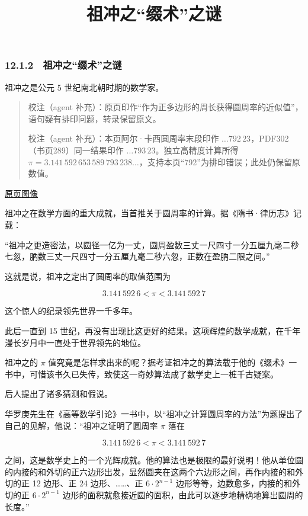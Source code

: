 \documentclass[
  10pt,
  fontset=fandol]{ctexart}
\title{祖冲之``缀术''之谜}
\author{}
\date{}
\begin{document}
\maketitle

\subsubsection{12.1.2　祖冲之``缀术''之谜}\label{ux7956ux51b2ux4e4bux7f00ux672fux4e4bux8c1c}

祖冲之是公元 5 世纪南北朝时期的数学家。

\begin{quote}
校注（agent 补充）：原页印作``作为正多边形的周长获得圆周率的近似值''，语句疑有排印问题，转录保留原文。

校注（agent 补充）：本页阿尔·卡西圆周率末段印作 \(\ldots792\,23\)，PDF302（书页289）同一结果印作 \(\ldots793\,23\)。独立高精度计算所得 \(\pi=3.141\,592\,653\,589\,793\,238\ldots\)，支持本页``792''为排印错误；此处仍保留原数值。
\end{quote}

\href{../../source-images/pdf-295.jpeg}{原页图像}

祖冲之在数学方面的重大成就，当首推关于圆周率的计算。据《隋书·律历志》记载：

``祖冲之更造密法，以圆径一亿为一丈，圆周盈数三丈一尺四寸一分五厘九毫二秒七忽，肭数三丈一尺四寸一分五厘九毫二秒六忽，正数在盈肭二限之间。''

这就是说，祖冲之定出了圆周率的取值范围为

\[
3.141\,592\,6<\pi<3.141\,592\,7
\]

这个惊人的纪录领先世界一千多年。

此后一直到 15 世纪，再没有出现比这更好的结果。这项辉煌的数学成就，在千年漫长岁月中一直处于世界领先的地位。

祖冲之的 \(\pi\) 值究竟是怎样求出来的呢？据考证祖冲之的算法载于他的《缀术》一书中，可惜该书久已失传，致使这一奇妙算法成了数学史上一桩千古疑案。

后人提出了诸多猜测和假说。

华罗庚先生在《高等数学引论》一书中，以``祖冲之计算圆周率的方法''为题提出了自己的见解，他说：``祖冲之证明了圆周率 \(\pi\) 落在

\[
3.141\,592\,6<\pi<3.141\,592\,7
\]

之间，这是数学史上的一个光辉成就。他的算法也是极限的最好说明！他从单位圆的内接的和外切的正六边形出发，显然圆夹在这两个六边形之间，再作内接的和外切的正 12 边形、正 24 边形、\ldots\ldots、正 \(6\cdot2^{n-1}\) 边形等等，边数愈多，内接的和外切的正 \(6\cdot2^{n-1}\) 边形的面积就愈接近圆的面积，由此可以逐步地精确地算出圆周的长度。''
\end{document}
